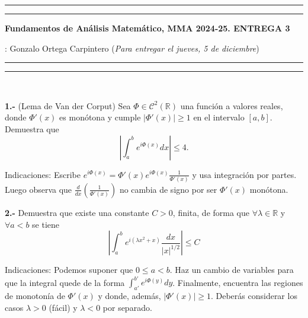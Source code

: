 \documentclass[11pt,a4paper]{article}
\begin{document}
\hrule\hrule
\vspace{2mm}

{\bf Fundamentos de Análisis Matemático, MMA 2024-25.
\hfill{ENTREGA 3}}

\vspace{3mm}

 : Gonzalo Ortega Carpintero \hfill ({\small \it Para entregar el jueves, 5 de diciembre})

\vspace{2mm}

\hrule\hrule

\vspace{2mm}

\

{\bf 1.-} (Lema de Van der Corput) Sea $\Phi\in\mathcal{C}^2(\mathbb R)$ una función a valores reales, donde $ \Phi'(x) $ es monótona y cumple $|\Phi'(x)|\ge 1$ en el intervalo $[a,b]$. Demuestra que
$$
\left|\int_a^b e^{i\Phi(x)}dx\right|\le 4. 
$$

 \vskip -1mm

{\sc Indicaciones}: Escribe $e^{i\Phi(x)}=\Phi'(x)e^{i\Phi(x)}\frac 1{\Phi'(x)}$ y usa integración por partes. Luego observa que $\frac d{dx}\left(\frac 1{\Phi'(x)}\right)$ no cambia de signo por ser $\Phi'(x)$ monótona. 

\vskip 8mm 

{\bf 2.-} Demuestra que existe una constante $C>0$, finita, de forma que $\forall \lambda\in \mathbb R$ y $\forall a<b$ se tiene
$$
\left|\int_a^b e^{i(\lambda x^2+x)}\frac{dx}{|x|^{1/2}}\right|\le C
$$
 \vskip -1mm

{\sc Indicaciones}: Podemos suponer que $0 \le a <b$. Haz un cambio de variables para que la integral quede de la forma $\displaystyle \int_{a'}^{b'} e^{i\Phi(y)}dy$. Finalmente, encuentra las regiones de monotonía de $\Phi'(x)$ y donde, además, $|\Phi'(x)|\ge 1$. Deberás considerar los casos $\lambda>0$ (fácil) y $  \lambda<0$ por separado. 
\vskip 1cm 

 
\end{document}
